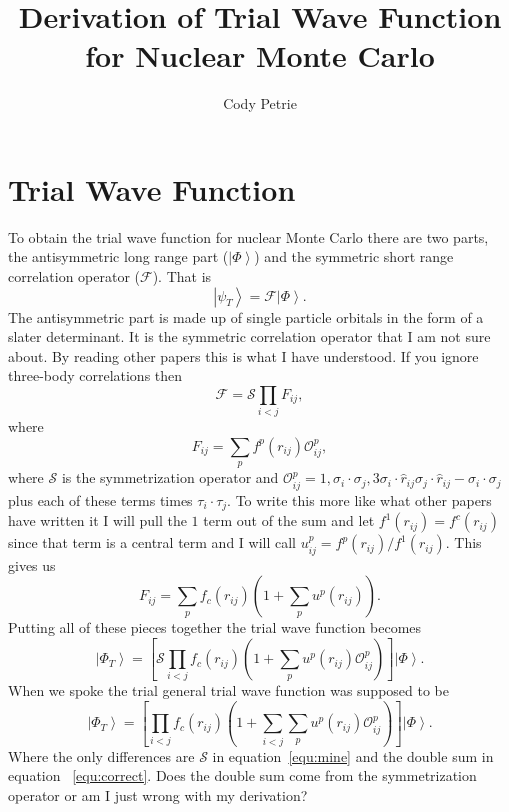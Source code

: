 \documentclass[12pt]{extarticle}
\title{Derivation of Trial Wave Function for Nuclear Monte Carlo}
\author{Cody Petrie}
\newcommand{\Oop}{\mathcal{O}^p_{ij}}
\newcommand{\ket}[1]{\left| #1 \right>}
\begin{document}
\maketitle

\section{Trial Wave Function}
To obtain the trial wave function for nuclear Monte Carlo there are two parts, the antisymmetric long range part ($\ket{\Phi}$) and the symmetric short range correlation operator ($\mathcal{F}$). That is
\begin{equation}
  \ket{\psi_T} = \mathcal{F} \ket{\Phi}.
\end{equation}
The antisymmetric part is made up of single particle orbitals in the form of a slater determinant. It is the symmetric correlation operator that I am not sure about. By reading other papers this is what I have understood. If you ignore three-body correlations then
\begin{equation}
  \mathcal{F} = \mathcal{S} \prod_{i<j} F_{ij},
\end{equation}
where
\begin{equation}
  F_{ij} = \sum_{p} f^p(r_{ij}) \Oop,
\end{equation}
where $\mathcal{S}$ is the symmetrization operator and $\Oop = 1, \sigma_i \cdot \sigma_j, 3\sigma_i \cdot \hat{r}_{ij} \sigma_j \cdot \hat{r}_{ij} - \sigma_i \cdot \sigma_j$ plus each of these terms times $\tau_i \cdot \tau_j$. To write this more like what other papers have written it I will pull the $1$ term out of the sum and let $f^1(r_{ij}) = f^c(r_{ij})$ since that term is a central term and I will call $u^p_{ij} = f^p(r_{ij})/f^1(r_{ij})$. This gives us
\begin{equation}
  F_{ij} = \sum_p f_c(r_{ij}) \left( 1 + \sum_p u^p(r_{ij}) \right).
\end{equation}
Putting all of these pieces together the trial wave function becomes
\begin{equation}
  \ket{\Phi_T} = \left[ \mathcal{S} \prod_{i<j} f_c(r_{ij}) \left(1+\sum_p u^p(r_{ij})\Oop\right) \right] \ket{\Phi}.
  \label{equ:mine}
\end{equation}
When we spoke the trial general trial wave function was supposed to be
\begin{equation}
  \ket{\Phi_T} = \left[ \prod_{i<j} f_c(r_{ij}) \left(1+\sum_{i<j}\sum_{p} u^p(r_{ij}) \Oop\right) \right]\ket{\Phi}.
  \label{equ:correct}
\end{equation}
Where the only differences are $\mathcal{S}$ in equation~\ref{equ:mine} and the double sum in equation ~\ref{equ:correct}. Does the double sum come from the symmetrization operator or am I just wrong with my derivation?
\end{document}
